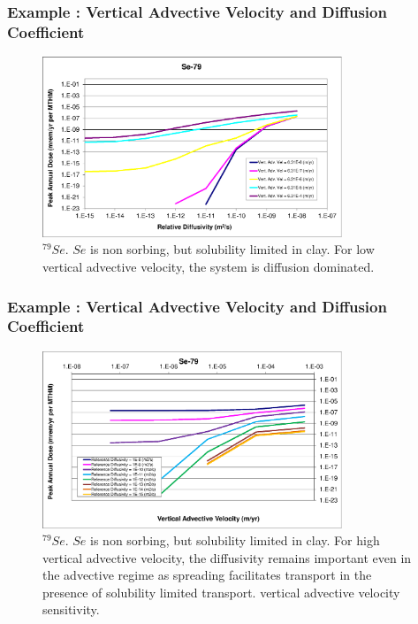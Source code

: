 \begin{frame}[c]
  \frametitle{Example : Vertical Advective Velocity and Diffusion Coefficient}
\begin{figure}[htp!]
\centering
\includegraphics[width=0.8\textwidth]{Se-79.eps}
\caption{$^{79}Se$.  $Se$ is non sorbing, but solubility limited in clay.  For low vertical advective velocity, the system is diffusion dominated.}
\label{fig:VAdvVelSe79}
\end{figure}
\end{frame}

\begin{frame}[c]
  \frametitle{Example : Vertical Advective Velocity and Diffusion Coefficient}
\begin{figure}[ht!]
\centering
\includegraphics[width=0.8\textwidth]{Se-79-VAdvVel.eps}
\caption{$^{79}Se$.
$Se$ is non sorbing, but solubility limited in clay.
For high vertical advective 
velocity, the diffusivity remains important even in the advective regime as 
spreading facilitates transport in the presence of solubility limited transport. 
vertical advective velocity sensitivity.}
\label{fig:VAdvVelSe79VAdvVel}
\end{figure}
\end{frame}

